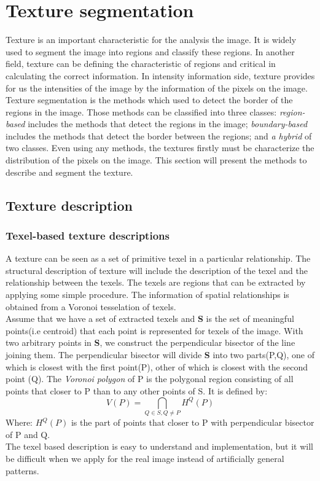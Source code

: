 \section{Texture segmentation}
Texture is an important characteristic for the analysis the image. It is widely used to segment the image into regions and classify these regions. In another field, texture can be defining the characteristic of regions and critical in calculating the correct information. In intensity information side, texture provides for us the intensities of the image by the information of the pixels on the image. Texture segmentation is the methods which used to detect the border of the regions in the image. Those methods can be classified into three classes: \textit{region-based} includes the methods that detect the regions in the image; \textit{boundary-based} includes the methods that detect the border between the regions; and \textit{a hybrid} of two classes. Even using any methods, the textures firstly must be characterize the distribution of the pixels on the image. This section will present the methods to describe and segment the texture.
\subsection{Texture description}
\subsubsection{Texel-based texture descriptions}
A texture can be seen as a set of primitive texel in a particular relationship. The structural description of texture will include the description of the texel and the relationship between the texels. The texels are regions that can be extracted by applying some simple procedure. The information of spatial relationships is obtained from a Voronoi tesselation of texels.\\[0.2cm]
Assume that we have a set of extracted texels and \textbf{S} is the set of meaningful points(i.e centroid) that each point is represented for texels of the image. With two arbitrary points in \textbf{S}, we construct the perpendicular bisector of the line joining them. The perpendicular bisector will divide \textbf{S} into two parts(P,Q), one of which is closest with the first point(P), other of which is closest with the second point (Q). The \textit{Voronoi polygon} of P is the polygonal region consisting of all points that closer to P than to any other points of S. It is defined by:
\begin{equation}
	V(P) = \bigcap_{Q \in S, Q \neq P} H^Q(P)
\end{equation}
Where: $H^Q(P)$ is the part of points that closer to P with perpendicular bisector of P and Q.\\
The texel based description is easy to understand and implementation, but it will be difficult when we apply for the real image instead of artificially general patterns.
